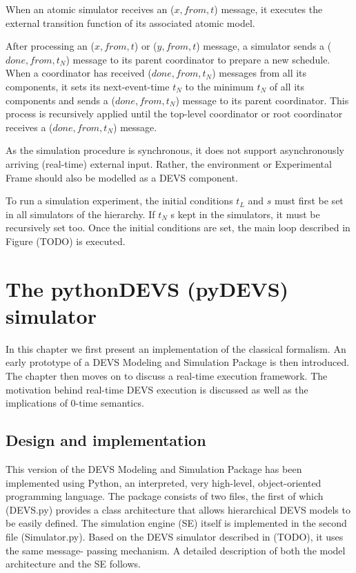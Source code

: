 When an atomic simulator receives an ($x, from, t$) message, it executes the external transition function of its associated atomic 
model.

After processing an ($x, from, t$) or ($y, from, t$) message, a simulator sends a ($done, from, t_N$) message to its parent 
coordinator to prepare a new schedule. When a coordinator has received ($done, from, t_N$) messages from all its components, 
it sets its next-event-time $t_N$ to the minimum $t_N$ of all its components and sends a ($done, from, t_N$) message to its parent 
coordinator. This process is recursively applied until the top-level coordinator or root coordinator receives a ($done, from, t_N$) 
message.


As the simulation procedure is synchronous, it does not support asynchronously arriving (real-time) external input. Rather, the 
environment or Experimental Frame should also be modelled as a DEVS component.

To run a simulation experiment, the initial conditions $t_L$ and $s$ must first be set in all simulators of the hierarchy. If $t_N$ 
s kept in the simulators, it must be recursively set too. Once the initial conditions are set, the main loop described in Figure 
(TODO) is executed.


\section{The pythonDEVS (pyDEVS) simulator}
In this chapter we first present an implementation of the classical formalism. An early prototype of a DEVS Modeling and Simulation 
Package is then introduced. The chapter then moves on to discuss a real-time execution framework. The motivation behind real-time 
DEVS execution is discussed as well as the implications of 0-time semantics.

\subsection{Design and implementation}
This version of the DEVS Modeling and Simulation Package has been implemented using Python, an interpreted, very high-level, 
object-oriented programming language. The package consists of two files, the first of which (DEVS.py) provides a class architecture 
that allows hierarchical DEVS models to be easily defined. The simulation engine (SE) itself is implemented in the second file 
(Simulator.py). Based on the DEVS simulator described in (TODO), it uses the same message- passing mechanism. A detailed description 
of both the model architecture and the SE follows.

